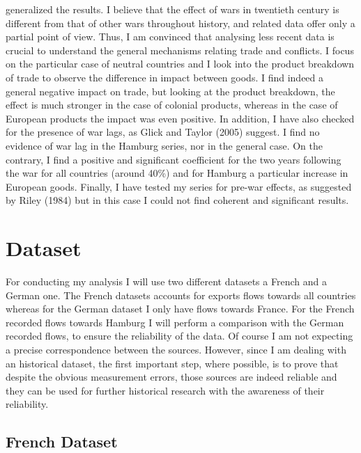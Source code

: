 \documentclass[12pt,a4paper,titlepage]{article}
\begin{document}
generalized the results. I believe that the effect of wars in twentieth century is different from that of other wars throughout history, and related data offer only a partial point of view. Thus, I am convinced that analysing less recent data is crucial to understand the general mechanisms relating trade and conflicts. I focus on the particular case of neutral countries and I look into the product breakdown of trade to observe the difference in impact between goods. I find indeed a general negative impact on trade, but looking at the product breakdown, the effect is much stronger in the case of colonial products, whereas in the case of European products the impact was even positive. In addition, I have also checked for the presence of war lags, as Glick and Taylor (2005) suggest. I find no evidence of war lag in the Hamburg series, nor in the general case. On the contrary, I find a positive and significant coefficient for the two years following the war for all countries (around 40\%) and for Hamburg a particular increase in European goods. Finally, I have tested my series for pre-war effects, as suggested by Riley (1984) but in this case I could not find coherent and significant results.


\section{Dataset}
For conducting my analysis I will use two different datasets a French and a German one. The French datasets accounts for exports flows towards all countries whereas for the German dataset I only have flows towards France. For the French recorded flows towards Hamburg I will perform a comparison with the German recorded flows, to ensure the reliability of the data. Of course I am not expecting a precise correspondence between the sources. However, since I am dealing with an historical dataset, the first important step, where possible, is to prove that despite the obvious measurement errors, those sources are indeed reliable and they can be used for further historical research with the awareness of their reliability. 

\subsection{French Dataset}
\end{document}
